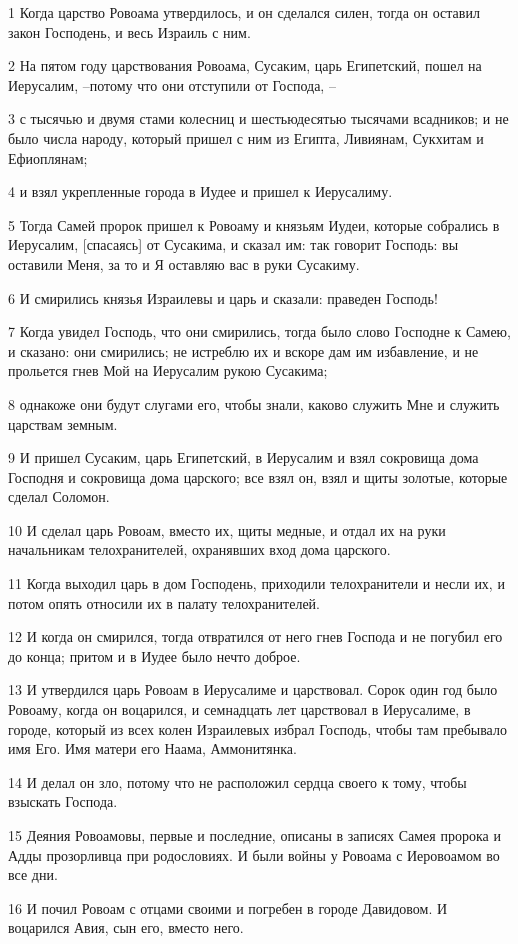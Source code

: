 \par 1 Когда царство Ровоама утвердилось, и он сделался силен, тогда он оставил закон Господень, и весь Израиль с ним.
\par 2 На пятом году царствования Ровоама, Сусаким, царь Египетский, пошел на Иерусалим, --потому что они отступили от Господа, --
\par 3 с тысячью и двумя стами колесниц и шестьюдесятью тысячами всадников; и не было числа народу, который пришел с ним из Египта, Ливиянам, Сукхитам и Ефиоплянам;
\par 4 и взял укрепленные города в Иудее и пришел к Иерусалиму.
\par 5 Тогда Самей пророк пришел к Ровоаму и князьям Иудеи, которые собрались в Иерусалим, [спасаясь] от Сусакима, и сказал им: так говорит Господь: вы оставили Меня, за то и Я оставляю вас в руки Сусакиму.
\par 6 И смирились князья Израилевы и царь и сказали: праведен Господь!
\par 7 Когда увидел Господь, что они смирились, тогда было слово Господне к Самею, и сказано: они смирились; не истреблю их и вскоре дам им избавление, и не прольется гнев Мой на Иерусалим рукою Сусакима;
\par 8 однакоже они будут слугами его, чтобы знали, каково служить Мне и служить царствам земным.
\par 9 И пришел Сусаким, царь Египетский, в Иерусалим и взял сокровища дома Господня и сокровища дома царского; все взял он, взял и щиты золотые, которые сделал Соломон.
\par 10 И сделал царь Ровоам, вместо их, щиты медные, и отдал их на руки начальникам телохранителей, охранявших вход дома царского.
\par 11 Когда выходил царь в дом Господень, приходили телохранители и несли их, и потом опять относили их в палату телохранителей.
\par 12 И когда он смирился, тогда отвратился от него гнев Господа и не погубил его до конца; притом и в Иудее было нечто доброе.
\par 13 И утвердился царь Ровоам в Иерусалиме и царствовал. Сорок один год было Ровоаму, когда он воцарился, и семнадцать лет царствовал в Иерусалиме, в городе, который из всех колен Израилевых избрал Господь, чтобы там пребывало имя Его. Имя матери его Наама, Аммонитянка.
\par 14 И делал он зло, потому что не расположил сердца своего к тому, чтобы взыскать Господа.
\par 15 Деяния Ровоамовы, первые и последние, описаны в записях Самея пророка и Адды прозорливца при родословиях. И были войны у Ровоама с Иеровоамом во все дни.
\par 16 И почил Ровоам с отцами своими и погребен в городе Давидовом. И воцарился Авия, сын его, вместо него.

